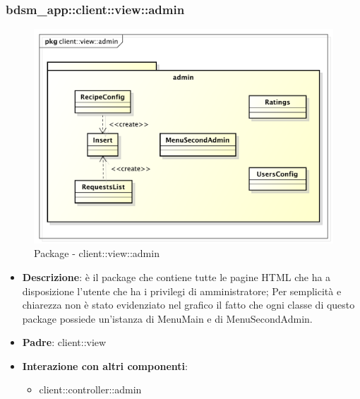 \subsubsection{bdsm\_app::client::view::admin} %
\label{ssub:bdsm_app_client_view_admin}
\begin{figure}[htbp]
	\centering
	\centerline{\includegraphics[scale=0.5]{./images/client_view_admin.pdf}}
	\caption{Package - client::view::admin}
\end{figure}

\begin{itemize}
	\item \textbf{Descrizione}: è il package che contiene tutte le pagine HTML che ha a disposizione l'utente che ha i privilegi di amministratore;\newline
	Per semplicità e chiarezza non è stato evidenziato nel grafico il fatto che ogni classe di questo package possiede un'istanza di MenuMain e di MenuSecondAdmin.
	\item \textbf{Padre}: client::view
	\item \textbf{Interazione con altri componenti}:
		\begin{itemize}
			\item client::controller::admin
		\end{itemize}
\end{itemize}


